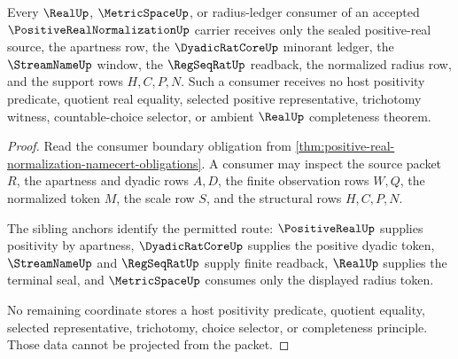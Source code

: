\begin{theorem}
\label{thm:positive-real-normalization-real-consumer-boundary}
Every $\RealUp$, $\MetricSpaceUp$, or radius-ledger consumer of an accepted $\PositiveRealNormalizationUp$ carrier receives only the sealed positive-real source, the apartness row, the $\DyadicRatCoreUp$ minorant ledger, the $\StreamNameUp$ window, the $\RegSeqRatUp$ readback, the normalized radius row, and the support rows $H,C,P,N$. Such a consumer receives no host positivity predicate, quotient real equality, selected positive representative, trichotomy witness, countable-choice selector, or ambient $\RealUp$ completeness theorem.
\end{theorem}
\begin{proof}
Read the consumer boundary obligation from \autoref{thm:positive-real-normalization-namecert-obligations}. A consumer may inspect the source packet $R$, the apartness and dyadic rows $A,D$, the finite observation rows $W,Q$, the normalized token $M$, the scale row $S$, and the structural rows $H,C,P,N$.

The sibling anchors identify the permitted route: $\PositiveRealUp$ supplies positivity by apartness, $\DyadicRatCoreUp$ supplies the positive dyadic token, $\StreamNameUp$ and $\RegSeqRatUp$ supply finite readback, $\RealUp$ supplies the terminal seal, and $\MetricSpaceUp$ consumes only the displayed radius token.

No remaining coordinate stores a host positivity predicate, quotient equality, selected representative, trichotomy, choice selector, or completeness principle. Those data cannot be projected from the packet.
\end{proof}


